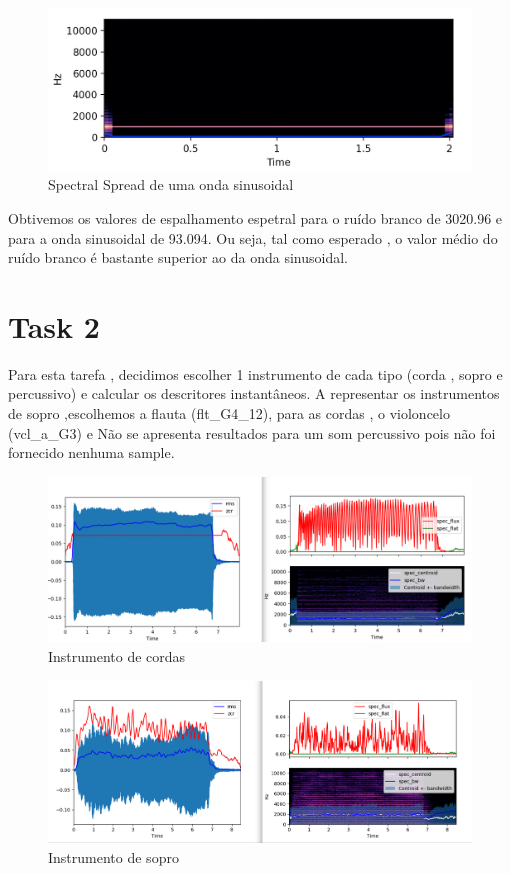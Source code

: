 \begin{figure}[H]
    \centering
    \includegraphics[width=.8\linewidth]{figs/image_4.png}
    \caption{Spectral Spread de uma onda sinusoidal}
    \label{fig:ss_2}
\end{figure}

Obtivemos os valores de espalhamento espetral para o ruído branco de 3020.96 e para a onda sinusoidal de 93.094.
Ou seja, tal como esperado , o valor médio do ruído branco é bastante superior ao da onda sinusoidal.


\section{Task 2} \label{ex_2}

Para esta tarefa , decidimos escolher 1 instrumento de cada tipo (corda , sopro e percussivo) e calcular os descritores instantâneos.
A representar os instrumentos de sopro ,escolhemos a flauta (flt\_G4\_12), para as cordas , o violoncelo (vcl\_a\_G3) e
Não se apresenta resultados para um som percussivo pois não foi fornecido nenhuma sample.

\begin{figure}[H]
    \centering
    \includegraphics[width=.8\linewidth]{figs/flt_G4_12.png}
    \caption{Instrumento de cordas}
    \label{fig:task2_1}
\end{figure}

\begin{figure}[H]
    \centering
    \includegraphics[width=.8\linewidth]{figs/vcl_a_G3_12.png}
    \caption{Instrumento de sopro}
    \label{fig:task2_2}
\end{figure}


